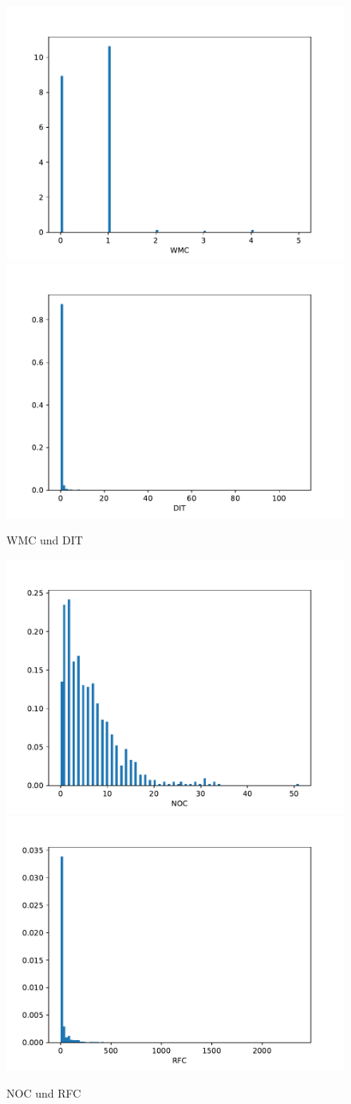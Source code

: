 \documentclass{scrreprt}
\begin{document}
\begin{figure}
 \includegraphics[width=.45\textwidth]{./WMC.pdf}
  \includegraphics[width=.45\textwidth]{./DIT.pdf}
 \caption{WMC und DIT}
 \label{abb:wmc}
\end{figure}


\begin{figure}
 \includegraphics[width=.45\textwidth]{./NOC.pdf}
  \includegraphics[width=.45\textwidth]{./RFC.pdf}
 \caption{NOC und RFC}
 \label{abb:noc_rfc}
\end{figure}
\end{document}
